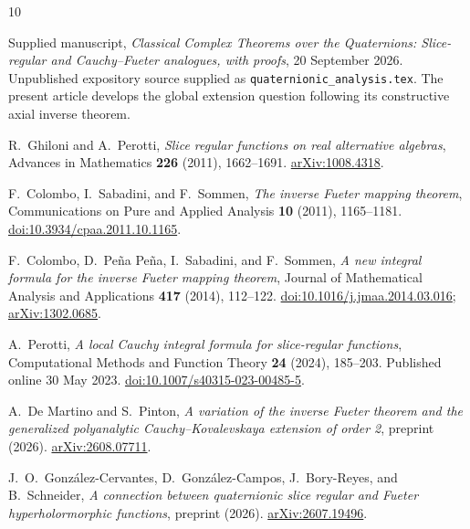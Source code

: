 \documentclass[11pt,a4paper]{article}
\numberwithin{equation}{section}
\theoremstyle{definition}
\theoremstyle{remark}
\begin{document}
\begin{thebibliography}{10}

Supplied manuscript,
\emph{Classical Complex Theorems over the Quaternions: Slice-regular and
Cauchy--Fueter analogues, with proofs}, 20 September 2026.
Unpublished expository source supplied as \texttt{quaternionic\_analysis.tex}.
The present article develops the global extension question following its
constructive axial inverse theorem.

R.~Ghiloni and A.~Perotti,
\emph{Slice regular functions on real alternative algebras},
Advances in Mathematics \textbf{226} (2011), 1662--1691.
\href{https://arxiv.org/abs/1008.4318}{arXiv:1008.4318}.

F.~Colombo, I.~Sabadini, and F.~Sommen,
\emph{The inverse Fueter mapping theorem},
Communications on Pure and Applied Analysis \textbf{10} (2011), 1165--1181.
\href{https://doi.org/10.3934/cpaa.2011.10.1165}{doi:10.3934/cpaa.2011.10.1165}.

F.~Colombo, D.~Pe\~na Pe\~na, I.~Sabadini, and F.~Sommen,
\emph{A new integral formula for the inverse Fueter mapping theorem},
Journal of Mathematical Analysis and Applications \textbf{417} (2014), 112--122.
\href{https://doi.org/10.1016/j.jmaa.2014.03.016}{doi:10.1016/j.jmaa.2014.03.016};
\href{https://arxiv.org/abs/1302.0685}{arXiv:1302.0685}.

A.~Perotti,
\emph{A local Cauchy integral formula for slice-regular functions},
Computational Methods and Function Theory \textbf{24} (2024), 185--203.
Published online 30 May 2023.
\href{https://doi.org/10.1007/s40315-023-00485-5}{doi:10.1007/s40315-023-00485-5}.

A.~De Martino and S.~Pinton,
\emph{A variation of the inverse Fueter theorem and the generalized
polyanalytic Cauchy--Kovalevskaya extension of order 2}, preprint (2026).
\href{https://arxiv.org/abs/2608.07711}{arXiv:2608.07711}.

J.~O.~Gonz\'alez-Cervantes, D.~Gonz\'alez-Campos, J.~Bory-Reyes, and B.~Schneider,
\emph{A connection between quaternionic slice regular and Fueter
hyperholormorphic functions}, preprint (2026).
\href{https://arxiv.org/abs/2607.19496}{arXiv:2607.19496}.

\end{thebibliography}
\end{document}
